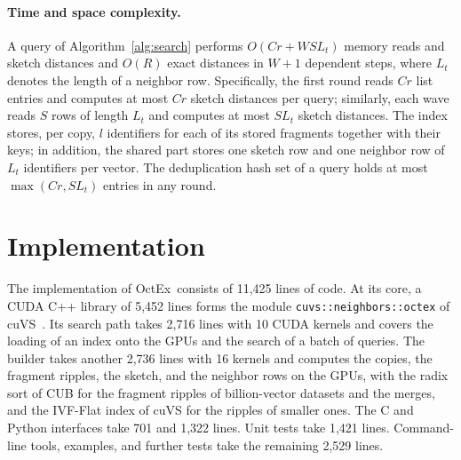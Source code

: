 \documentclass[letterpaper,twocolumn,10pt]{article}
\newcommand{\sysname}{OctEx}
\begin{document}
\paragraph{Time and space complexity.} A query of Algorithm~\ref{alg:search} performs $O(C r + W S L_t)$ memory reads and sketch distances and $O(R)$ exact distances in $W + 1$ dependent steps, where $L_t$ denotes the length of a neighbor row. Specifically, the first round reads $C r$ list entries and computes at most $C r$ sketch distances per query; similarly, each wave reads $S$ rows of length $L_t$ and computes at most $S L_t$ sketch distances. The index stores, per copy, $l$ identifiers for each of its stored fragments together with their keys; in addition, the shared part stores one sketch row and one neighbor row of $L_t$ identifiers per vector. The deduplication hash set of a query holds at most $\max(C r, S L_t)$ entries in any round.

\section{Implementation}
\label{sec:impl}

The implementation of \sysname\ consists of 11,425 lines of code. At its core, a CUDA C++ library of 5,452 lines forms the module \texttt{cuvs::neighbors::octex} of cuVS~\cite{nvidia2025cuvs}. Its search path takes 2,716 lines with 10 CUDA kernels and covers the loading of an index onto the GPUs and the search of a batch of queries. The builder takes another 2,736 lines with 16 kernels and computes the copies, the fragment ripples, the sketch, and the neighbor rows on the GPUs, with the radix sort of CUB for the fragment ripples of billion-vector datasets and the merges, and the IVF-Flat index of cuVS for the ripples of smaller ones. The C and Python interfaces take 701 and 1,322 lines. Unit tests take 1,421 lines. Command-line tools, examples, and further tests take the remaining 2,529 lines.
\end{document}
